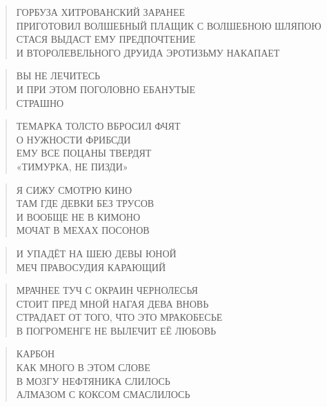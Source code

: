 \poemtitle{***}
\begin{verse}
ГОРБУЗА ХИТРОВАНСКИЙ ЗАРАНЕЕ\\
ПРИГОТОВИЛ ВОЛШЕБНЫЙ ПЛАЩИК С ВОЛШЕБНОЮ ШЛЯПОЮ\\
СТАСЯ ВЫДАСТ ЕМУ ПРЕДПОЧТЕНИЕ\\
И ВТОРОЛЕВЕЛЬНОГО ДРУИДА ЭРОТИЗЬМУ НАКАПАЕТ
\end{verse}

\poemtitle{***}
\begin{verse}
ВЫ НЕ ЛЕЧИТЕСЬ\\
И ПРИ ЭТОМ ПОГОЛОВНО ЕБАНУТЫЕ\\
СТРАШНО
\end{verse}

\poemtitle{***}
\begin{verse}
ТЕМАРКА ТОЛСТО ВБРОСИЛ ФЧЯТ\\
О НУЖНОСТИ ФРИБСДИ\\
ЕМУ ВСЕ ПОЦАНЫ ТВЕРДЯТ\\
«ТИМУРКА, НЕ ПИЗДИ»
\end{verse}

\poemtitle{***}
\begin{verse}
Я СИЖУ СМОТРЮ КИНО\\
ТАМ ГДЕ ДЕВКИ БЕЗ ТРУСОВ\\
И ВООБЩЕ НЕ В КИМОНО\\
МОЧАТ В МЕХАХ ПОСОНОВ
\end{verse}

\poemtitle{***}
\begin{verse}
И УПАДЁТ НА ШЕЮ ДЕВЫ ЮНОЙ\\
МЕЧ ПРАВОСУДИЯ КАРАЮЩИЙ
\end{verse}

\poemtitle{***}
\begin{verse}
МРАЧНЕЕ ТУЧ С ОКРАИН ЧЕРНОЛЕСЬЯ\\
СТОИТ ПРЕД МНОЙ НАГАЯ ДЕВА ВНОВЬ\\
СТРАДАЕТ ОТ ТОГО, ЧТО  ЭТО МРАКОБЕСЬЕ\\
В ПОГРОМЕНГЕ НЕ ВЫЛЕЧИТ ЕЁ ЛЮБОВЬ
\end{verse}

\poemtitle{***}
\begin{verse}
КАРБОН\\
КАК МНОГО В ЭТОМ СЛОВЕ\\
В МОЗГУ НЕФТЯНИКА СЛИЛОСЬ\\
АЛМАЗОМ С КОКСОМ СМАСЛИЛОСЬ
\end{verse}

